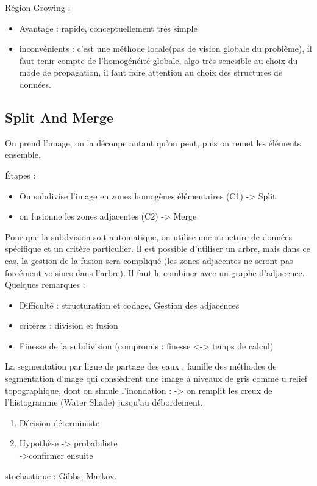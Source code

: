 \documentclass[11pt]{article}
\begin{document}
Région Growing :
\begin{itemize} 
	\item Avantage : rapide, conceptuellement très simple
	\item inconvénients : c'est une méthode locale(pas de vision globale du problème), il faut tenir compte de l'homogénéité globale, algo très senesible au choix du mode de propagation, il faut faire attention au choix des structures de données.
\end{itemize}

\subsection{Split And Merge}
On prend l'image, on la découpe autant qu'on peut, puis on remet les éléments ensemble.

Étapes :
\begin{itemize}
	\item On subdivise l'image en zones homogènes élémentaires (C1) -> Split
	\item on fusionne les zones adjacentes (C2) -> Merge
\end{itemize}
Pour que la subdvision soit automatique, on utilise une structure de données spécifique et un critère particulier. Il est possible d'utiliser un arbre, mais dans ce cas, la gestion de la fusion sera compliqué (les zones adjacentes ne seront pas forcément voisines dans l'arbre). Il faut le combiner avec un graphe d'adjacence.\\

\vskip 1cm
Quelques remarques : 
\begin{itemize}
	\item Difficulté  : structuration et codage, Gestion des adjacences
	\item critères : division et fusion
	\item Finesse de la subdivision (compromis : finesse <-> temps de calcul)
\end{itemize}

La segmentation par ligne de partage des eaux : famille des méthodes de segmentation d'mage qui consièdrent une image à niveaux de gris comme u relief topographique, dont on simule l'inondation : -> on remplit les creux de l'histogramme (Water Shade) jusqu'au débordement.


\vskip 1cm
\begin{enumerate}
	\item Décision déterministe
	\item Hypothèse -> probabiliste\\
		->confirmer ensuite
\end{enumerate}
stochastique : Gibbs, Markov.
\end{document}
